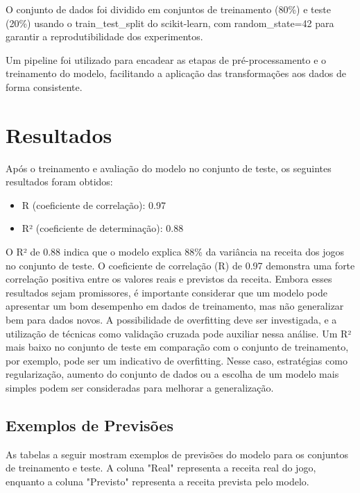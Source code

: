 \documentclass[12pt]{article}
\begin{document}
O conjunto de dados foi dividido em conjuntos de treinamento (80\%) e teste (20\%) usando o train\_test\_split do scikit-learn, com random\_state=42 para garantir a reprodutibilidade dos experimentos.

Um pipeline foi utilizado para encadear as etapas de pré-processamento e o treinamento do modelo, facilitando a aplicação das transformações aos dados de forma consistente.

\section{Resultados}
Após o treinamento e avaliação do modelo no conjunto de teste, os seguintes resultados foram obtidos:

\begin{itemize}
\item R (coeficiente de correlação): 0.97
\item R² (coeficiente de determinação): 0.88
\end{itemize}

O R² de 0.88 indica que o modelo explica 88\% da variância na receita dos jogos no conjunto de teste.  O coeficiente de correlação (R) de 0.97 demonstra uma forte correlação positiva entre os valores reais e previstos da receita. Embora esses resultados sejam promissores, é importante considerar que um modelo pode apresentar um bom desempenho em dados de treinamento, mas não generalizar bem para dados novos.  A possibilidade de overfitting deve ser investigada, e a utilização de técnicas como validação cruzada pode auxiliar nessa análise.  Um R² mais baixo no conjunto de teste em comparação com o conjunto de treinamento, por exemplo, pode ser um indicativo de overfitting.  Nesse caso, estratégias como regularização, aumento do conjunto de dados ou a escolha de um modelo mais simples podem ser consideradas para melhorar a generalização.

\subsection{Exemplos de Previsões}

As tabelas a seguir mostram exemplos de previsões do modelo para os conjuntos de treinamento e teste.  A coluna "Real" representa a receita real do jogo, enquanto a coluna "Previsto" representa a receita prevista pelo modelo.
\end{document}
